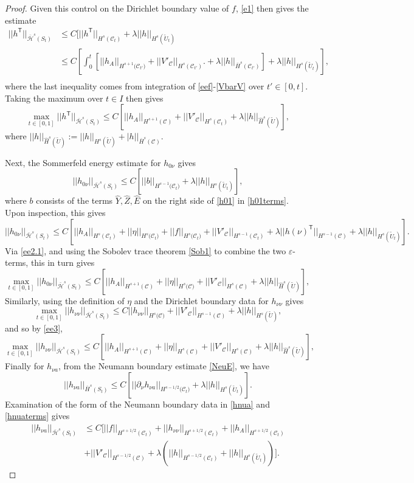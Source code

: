 \documentclass[10pt]{amsart}
\newcommand{\e}{\varepsilon}
\renewcommand{\l}{\lambda}
\newcommand{\cC}{{\mathcal C}}
\newcommand{\cH}{{\mathcal H}}
\newcommand{\tT}{\mathsf{T}}
\newcommand{\be}{\begin{equation}}
\newcommand{\ee}{\end{equation}}
\newcommand{\p}{\partial}
\renewcommand{\hat}{\widehat}
\newcommand{\<}{\langle}
\renewcommand{\>}{\rangle}
\newcommand{\w}{\widetilde}
\theoremstyle{plain}
\theoremstyle{remark}
\theoremstyle{definition}
\numberwithin{equation}{section}
\begin{document}
\begin{proof}
Given this control on the Dirichlet boundary value of $f$, \eqref{e1} then gives the estimate 
\be \label{ee2}
\begin{split}
||h^{\tT}||_{\bar \cH^s(S_t)} & \leq  C[||h^{\tT}||_{H^s(\cC_t)} + \l ||h||_{H^s(\w U_t)} \\
& \leq C[\int_0^t [ ||h_A||_{H^{s+1}({\cC_{t'})}} +||V'_{\cC}||_{H^s(\cC_{t'})}.+ \l ||h||_{\bar H^s(\cC_{t'})} ] +  \l ||h||_{H^s(\w U_t)}], \\
\end{split}
\ee
where the last inequality comes from integration of \eqref{eef}-\eqref{VbarV} over $t' \in [0,t]$. 
Taking the maximum over $t \in I$ then gives 
\be \label{ee2.1}
\max_{t\in [0,1]} ||h^{\tT}||_{\bar \cH^s(S_t)} \leq C[ ||h_A||_{H^{s+1}(\cC)} + ||V'_{\cC}||_{H^s(\cC_t)} +  \l ||h||_{\hat H^s(\w U)}],
\ee
where $||h||_{\hat H^s(\w U)} :=  ||h||_{H^s(\w U)} + |h||_{\bar H^s(\cC)}$. 

Next, the Sommerfeld energy estimate for $h_{0\nu}$ gives 
$$||h_{0\nu}||_{\bar \cH^s(S_t)} \leq C[||b||_{H^{s-1}({\cC_t)}} + \l ||h||_{H^s(\w U_t)} ],$$
where $b$ consists of the terms $\hat Y, \hat Z, \hat E$ on the right side of \eqref{h01} in \eqref{h01terms}. Upon inspection, this gives 
$$||h_{0\nu}||_{\bar \cH^s(S_t)} \leq C[ ||h_A||_{H^s(\cC_t)} +  ||\eta||_{H^{s}({\cC_t)}} + ||f||_{H^{s}({\cC_t)}} + ||V'_{\cC}||_{H^{s-1}(\cC_t)} + 
 \l ||h(\nu)^{\tT}||_{H^{s-1}(\cC)} + \l ||h||_{H^s(\w U_t)}].$$
Via \eqref{ee2.1}, and using the Sobolev trace theorem \eqref{Sob1} to combine the two $\e$-terms, this in turn gives 
\be \label{ee3}
\max_{t\in [0,1]} ||h_{0\nu}||_{\bar \cH^s(S_t)} \leq C[ ||h_A||_{H^{s+1}(\cC)} +  ||\eta||_{H^{s}({\cC)}} + ||V'_{\cC}||_{H^{s}(\cC)} +  \l ||h||_{\hat H^s(\w U)}],
\ee
Similarly, using the definition of $\eta$ and the Dirichlet boundary data for $h_{\nu \nu}$ gives 
$$\max_{t\in [0,1]}||h_{\nu \nu}||_{\bar \cH^s(S_t)} \leq C||h_{\nu \nu}||_{H^s({\cC)}} + ||V'_{\cC}||_{H^{s-1}(\cC)} + \l ||h||_{H^s(\w U)}, $$
and so by \eqref{ee3},
\be \label{ee4}
\max_{t\in [0,1]} ||h_{\nu \nu}||_{\bar \cH^s(S_t)} \leq C[ ||h_A||_{H^{s+1}(\cC)} + ||\eta||_{H^{s}(\cC)} + ||V'_{\cC}||_{H^{s}(\cC)} + \l  ||h||_{\hat H^s(\w U)}],
\ee
Finally for $h_{\nu a}$, from the Neumann boundary estimate \eqref{NeuE}, we have 
$$||h_{\nu a}||_{\bar H^s(S_t)} \leq C[||\p_{\nu}h_{\nu a}||_{H^{s-1/2}({\cC_t)}} + \l ||h||_{H^{s}(\w U_t)}]. $$ 
Examination of the form of the Neumann boundary data in \eqref{hnua} and \eqref{hnuaterms} gives 
\be \label{ee5}
\begin{split}
||h_{\nu a}||_{\bar \cH^s(S_t)} & \leq C[ ||f||_{H^{s+1/2}(\cC_t)} + ||h_{\nu \nu}||_{H^{s+1/2}(\cC_t)} + ||h_A||_{H^{s+1/2}(\cC_t)} \\
& + ||V'_{\cC}||_{H^{s-1/2}(\cC)} + \l(||h||_{H^{s-1/2}(\cC_t)} + ||h||_{H^{s}(\w U_t)})].
\end{split}
\ee 


\end{proof}
\end{document}
